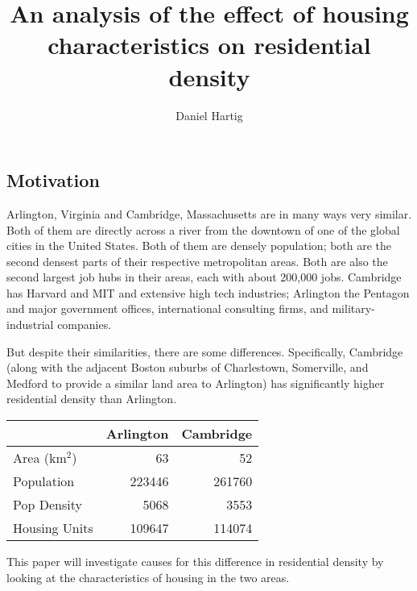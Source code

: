 \documentclass{article}
\title{An analysis of the effect of housing characteristics on residential density}
\author{Daniel Hartig}
\begin{document}
\maketitle


\subsection*{Motivation}

Arlington, Virginia and Cambridge, Massachusetts are in many ways very similar. Both of them are directly across a river from the downtown of one of the global cities in the United States. Both of them are densely population; both are the second densest parts of their respective metropolitan areas. Both are also the second largest job hubs in their areas, each with about 200,000 jobs. Cambridge has Harvard and MIT and extensive high tech industries; Arlington the Pentagon and major government offices, international consulting firms, and military-industrial companies. 

But despite their similarities, there are some differences. Specifically, Cambridge (along with the adjacent Boston suburbs of Charlestown, Somerville, and Medford to provide a similar land area to Arlington) has significantly higher residential density than Arlington. 
\begin{center}\begin{tabular}{|l|r|r|}
\hline &Arlington&Cambridge\\
\hline Area (km$^2$)&63&52\\
\hline Population & 223446&261760\\
\hline Pop Density & 5068&3553\\
\hline Housing Units & 109647&114074\\
\hline\end{tabular}\end{center}

This paper will investigate causes for this difference in residential density by looking at the characteristics of housing in the two areas. 
\end{document}
